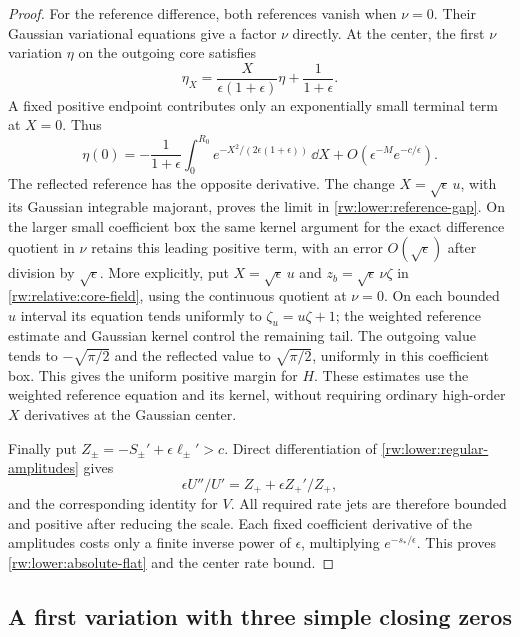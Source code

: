 \begin{proof}
For the reference difference, both references vanish when $\nu=0$.
Their Gaussian variational equations give a factor $\nu$ directly.
At the center, the first $\nu$ variation $\eta$ on the outgoing
core satisfies
\[
 \eta_X=\frac{X}{\epsilon(1+\epsilon)}\eta+\frac1{1+\epsilon}.
\]
A fixed positive endpoint contributes only an exponentially small
terminal term at $X=0$. Thus
\[
 \eta(0)=-\frac1{1+\epsilon}
       \int_0^{R_0}e^{-X^2/(2\epsilon(1+\epsilon))}\,\dd X
       +O(\epsilon^{-M}e^{-c/\epsilon}).
\]
The reflected reference has the opposite derivative. The change
$X=\sqrt\epsilon\,u$, with its Gaussian integrable majorant, proves
the limit in \eqref{rw:lower:reference-gap}.
On the larger small coefficient box the same kernel argument for
the exact difference quotient in $\nu$ retains this leading positive
term, with an error $O(\sqrt\epsilon)$ after division by
$\sqrt\epsilon$. More explicitly, put $X=\sqrt\epsilon\,u$ and
$z_b=\sqrt\epsilon\,\nu\zeta$ in
\eqref{rw:relative:core-field}, using the continuous quotient at
$\nu=0$. On each bounded $u$ interval its equation tends uniformly
to $\zeta_u=u\zeta+1$; the weighted reference estimate and Gaussian
kernel control the remaining tail. The outgoing value tends to
$-\sqrt{\pi/2}$ and the reflected value to $\sqrt{\pi/2}$,
uniformly in this coefficient box. This gives the uniform positive
margin for $H$.
These estimates use the weighted reference equation and its kernel,
without requiring ordinary high-order $X$ derivatives at the Gaussian
center.

Finally put $Z_\pm=-S_\pm'+\epsilon\ell_\pm'>c$.
Direct differentiation of \eqref{rw:lower:regular-amplitudes} gives
\[
 \epsilon U''/U'=Z_++\epsilon Z_+' /Z_+,
\]
and the corresponding identity for $V$. All required rate jets are
therefore bounded and positive after reducing the scale.
Each fixed coefficient derivative of the amplitudes costs only a
finite inverse power of $\epsilon$, multiplying $e^{-s_*/\epsilon}$.
This proves \eqref{rw:lower:absolute-flat} and the center rate bound.
\end{proof}

\subsection{A first variation with three simple closing zeros}


